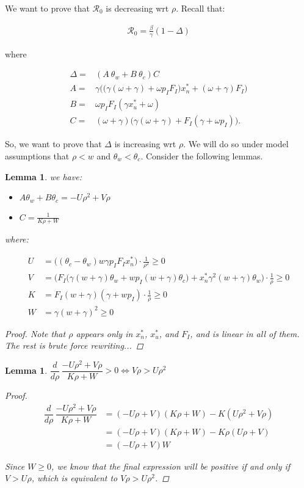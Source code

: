 \documentclass[12pt]{article}
\newtheorem{lemma}[theorem]{Lemma}
\newcommand{\Rnum}{\mathcal{R}_0}
\begin{document}
We want to prove that $\Rnum$ is decreasing wrt $\rho$. Recall that:

\begin{align}
    \Rnum = \frac{\beta}{\gamma}(1-\Delta)
\end{align}

where

\begin{align}
\Delta =& (A~ \theta_w + B~ \theta_c) C 
\\
A=& \gamma \Big( \big(\gamma(\omega+\gamma) + \omega p_I F_I \big) x_n^* + (\omega+\gamma) F_I \Big) \\
B=& \omega p_I F_I (\gamma x_u^*+\omega) \\ 
C=& (\omega+\gamma) \Big(\gamma(\omega+\gamma)+F_I(\gamma+\omega p_I) \Big).
\end{align}

So, we want to prove that $\Delta$ is increasing wrt $\rho$. We will do so under model assumptions that $\rho < w$ and $\theta_w < \theta_c$. Consider the following lemmas.

\begin{lemma} we have:
\begin{itemize}
    \item $A\theta_w + B\theta_c = -U\rho^2 + V\rho$
    \item $C = \frac{1}{K\rho+W}$
\end{itemize} where:

\begin{align}
    U &= \Big((\theta_c-\theta_w)w\gamma p_IF_Ix^*_n\Big)\cdot \frac{1}{\rho^2} \geq 0\\
    V &= \Big(F_I\big(\gamma(w+\gamma)\theta_w+wp_I(w+\gamma)\theta_c\big) + x^*_n\gamma^2(w+\gamma)\theta_w\Big)\cdot \frac{1}{\rho} \geq 0 \\
    K &= F_I(w+\gamma)(\gamma+wp_I) \cdot \frac{1}{\rho} \geq 0 \\
    W &= \gamma(w+\gamma)^2 \geq 0
\end{align}
\begin{proof}
Note that $\rho$ appears only in $x^*_n$, $x^*_u$, and $F_I$, and is linear in all of them. The rest is brute force rewriting...
\end{proof}
\end{lemma}

\begin{lemma} $\dfrac{d}{d\rho} \, \dfrac{-U\rho^2+V\rho}{K\rho+W} > 0 \Longleftrightarrow V\rho > U\rho^2$
\begin{proof}
\begin{align}
    \dfrac{d}{d\rho} \, \dfrac{-U\rho^2+V\rho}{K\rho+W} &= (-U\rho+V)(K\rho+W) - K(U\rho^2+V\rho) \\
    &= (-U\rho+V)(K\rho+W) - K\rho(U\rho+V) \\
    &= (-U\rho+V)W
\end{align}

Since $W \geq 0$, we know that the final expression will be positive if and only if $V > U\rho$, which is equivalent to $V\rho > U\rho^2$.
\end{proof}
\end{lemma}
\end{document}
